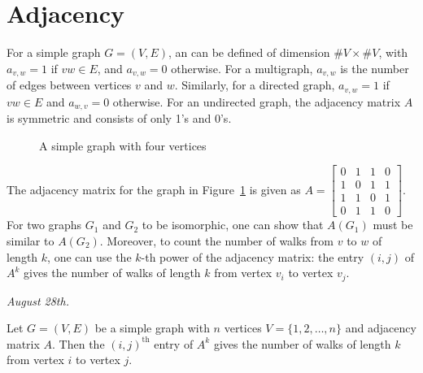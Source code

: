 \section{Adjacency}

For a simple graph $G = (V,E)$, an  can be defined of dimension $\# V \times \# V$, with $a_{v,w} = 1$ if $vw \in E$, and $a_{v,w} = 0$ otherwise. For a multigraph, $a_{v,w}$ is the number of edges between vertices $v$ and $w$. Similarly, for a directed graph, $a_{v,w} = 1$ if $vw \in E$ and $a_{w,v} = 0$ otherwise. For an undirected graph, the adjacency matrix $A$ is symmetric and consists of only 1's and 0's. 

\begin{figure}[h]
    \centering
    \caption{A simple graph with four vertices}
    \label{fig:graph_example}
\end{figure}
The adjacency matrix for the graph in Figure~\ref{fig:graph_example} is given as
$
A =
\begin{bmatrix}
0 & 1 & 1 & 0 \\
1 & 0 & 1 & 1 \\
1 & 1 & 0 & 1 \\
0 & 1 & 1 & 0
\end{bmatrix}
$. For two graphs $G_{1}$ and $G_{2}$ to be isomorphic, one can show that $A(G_{1})$ must be similar to $A(G_{2})$. Moreover, to count the number of walks from $v$ to $w$ of length $k$, one can use the $k$-th power of the adjacency matrix: the entry $(i,j)$ of $A^{k}$ gives the number of walks of length $k$ from vertex $v_{i}$ to vertex $v_{j}$.

\textit{August 28th.}
\begin{theorem}
    Let $G = (V,E)$ be a simple graph with $n$ vertices $V = \{1,2,\ldots,n\}$ and adjacency matrix $A$. Then the $(i,j)^{\text{th}}$ entry of $A^{k}$ gives the number of walks of length $k$ from vertex $i$ to vertex $j$.
\end{theorem}

